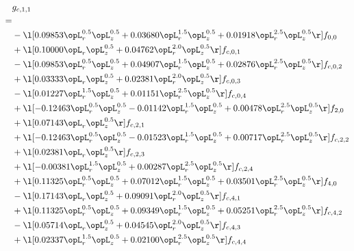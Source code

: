 \begin{alignat}{2} 
\label{eq:g_11_0} 
& g_{c,1,1} \nonumber \\ 
 = \\ 
& - \l[  0.09853 \opL_r^{0.5} \opL_z^{0.5} +  0.03680 \opL_r^{1.5} \opL_z^{0.5} +  0.01918 \opL_r^{2.5} \opL_z^{0.5}  \r] f_{0,0} \nonumber \\ 
& + \l[  0.10000 \opL_r \opL_z^{0.5} +  0.04762 \opL_r^{2.0} \opL_z^{0.5}  \r] f_{c,0,1} \nonumber \\ 
& - \l[  0.09853 \opL_r^{0.5} \opL_z^{0.5} +  0.04907 \opL_r^{1.5} \opL_z^{0.5} +  0.02876 \opL_r^{2.5} \opL_z^{0.5}  \r] f_{c,0,2} \nonumber \\ 
& + \l[  0.03333 \opL_r \opL_z^{0.5} +  0.02381 \opL_r^{2.0} \opL_z^{0.5}  \r] f_{c,0,3} \nonumber \\ 
& - \l[  0.01227 \opL_r^{1.5} \opL_z^{0.5} +  0.01151 \opL_r^{2.5} \opL_z^{0.5}  \r] f_{c,0,4} \nonumber \\ 
& + \l[  -0.12463 \opL_r^{0.5} \opL_z^{0.5}   -0.01142 \opL_r^{1.5} \opL_z^{0.5} +  0.00478 \opL_r^{2.5} \opL_z^{0.5}  \r] f_{2,0} \nonumber \\ 
& + \l[  0.07143 \opL_r \opL_z^{0.5}  \r] f_{c,2,1} \nonumber \\ 
& + \l[  -0.12463 \opL_r^{0.5} \opL_z^{0.5}   -0.01523 \opL_r^{1.5} \opL_z^{0.5} +  0.00717 \opL_r^{2.5} \opL_z^{0.5}  \r] f_{c,2,2} \nonumber \\ 
& + \l[  0.02381 \opL_r \opL_z^{0.5}  \r] f_{c,2,3} \nonumber \\ 
& + \l[  -0.00381 \opL_r^{1.5} \opL_z^{0.5} +  0.00287 \opL_r^{2.5} \opL_z^{0.5}  \r] f_{c,2,4} \nonumber \\ 
& + \l[  0.11325 \opL_r^{0.5} \opL_z^{0.5} +  0.07012 \opL_r^{1.5} \opL_z^{0.5} +  0.03501 \opL_r^{2.5} \opL_z^{0.5}  \r] f_{4,0} \nonumber \\ 
& - \l[  0.17143 \opL_r \opL_z^{0.5} +  0.09091 \opL_r^{2.0} \opL_z^{0.5}  \r] f_{c,4,1} \nonumber \\ 
& + \l[  0.11325 \opL_r^{0.5} \opL_z^{0.5} +  0.09349 \opL_r^{1.5} \opL_z^{0.5} +  0.05251 \opL_r^{2.5} \opL_z^{0.5}  \r] f_{c,4,2} \nonumber \\ 
& - \l[  0.05714 \opL_r \opL_z^{0.5} +  0.04545 \opL_r^{2.0} \opL_z^{0.5}  \r] f_{c,4,3} \nonumber \\ 
& + \l[  0.02337 \opL_r^{1.5} \opL_z^{0.5} +  0.02100 \opL_r^{2.5} \opL_z^{0.5}  \r] f_{c,4,4} \nonumber \\ 
\end{alignat} 



